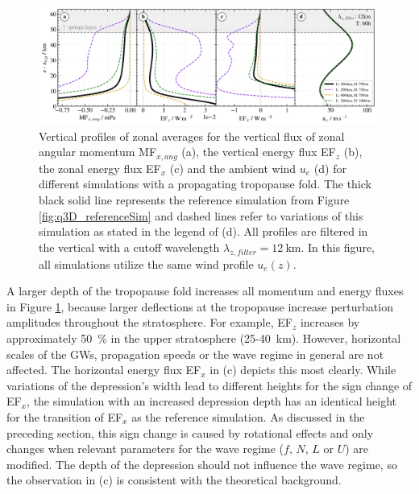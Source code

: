 \begin{figure}[t]
    \centering
    \includegraphics[width=0.99\textwidth]{figures_q3D/TD-zprofiles-translbq3D_shape-T60h-avg.png}
    \caption{Vertical profiles of zonal averages for the vertical flux of zonal angular momentum MF$_{x,ang}$ (a), the vertical energy flux EF$_z$ (b), the zonal energy flux EF$_x$ (c) and the ambient wind $u_e$ (d) for different simulations with a propagating tropopause fold. The thick black solid line represents the reference simulation from Figure \ref{fig:q3D_referenceSim} and dashed lines refer to variations of this simulation as stated in the legend of (d). All profiles are filtered in the vertical with a cutoff wavelength $\lambda_{z,filter}=\SI{12}{\kilo\meter}$. In this figure, all simulations utilize the same wind profile $u_e(z)$.}
    \label{fig:q3D_shape}
\end{figure}
A larger depth of the tropopause fold increases all momentum and energy fluxes in Figure \ref{fig:q3D_shape}, because larger deflections at the tropopause increase perturbation amplitudes throughout the stratosphere. For example, EF$_z$ increases by approximately \SI{50}{\percent} in the upper stratosphere (25-\SI{40}{\kilo\meter}). However, horizontal scales of the GWs, propagation speeds or the wave regime in general are not affected. The horizontal energy flux EF$_x$ in (c) depicts this most clearly. While variations of the depression's width lead to different heights for the sign change of EF$_x$, the simulation with an increased depression depth has an identical height for the transition of EF$_x$ as the reference simulation. As discussed in the preceding section, this sign change is caused by rotational effects and only changes when relevant parameters for the wave regime ($f$, $N$, $L$ or $U$) are modified. The depth of the depression should not influence the wave regime, so the observation in (c) is consistent with the theoretical background.
%
